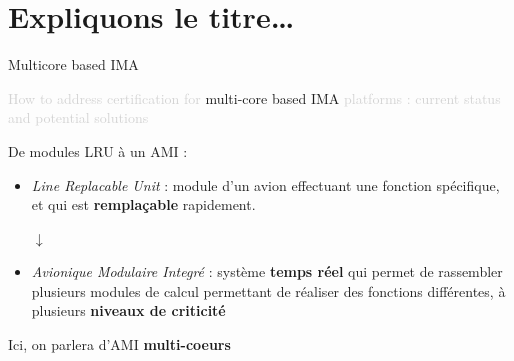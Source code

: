 \documentclass{beamer}
\begin{document}
\section{Expliquons le titre…} 
\begin{frame}[t]{Multicore based IMA} 
  
  \begin{center}
    \begin{mdframed}[style=yellowbox]
      {\small\textcolor{lightgray}{How to address certification for} multi-core based IMA \textcolor{lightgray}{platforms :
       current status and potential solutions}}
       \end{mdframed}
  \end{center}
  
      De modules LRU à un AMI :
      \begin{itemize}
          \item \textit{Line Replacable Unit} : module d'un avion effectuant une fonction spécifique, et qui est \textbf{remplaçable} rapidement. \\
          \begin{center}
              $\downarrow$
          \end{center}
          \item \textit{Avionique Modulaire Integré} : système \textbf{temps réel} qui permet de rassembler plusieurs 
          modules de calcul permettant de réaliser des fonctions différentes, à plusieurs \textbf{niveaux de criticité} \\
      \end{itemize}
	  Ici, on parlera d'AMI \textbf{multi-coeurs}
\end{frame}
\end{document}
